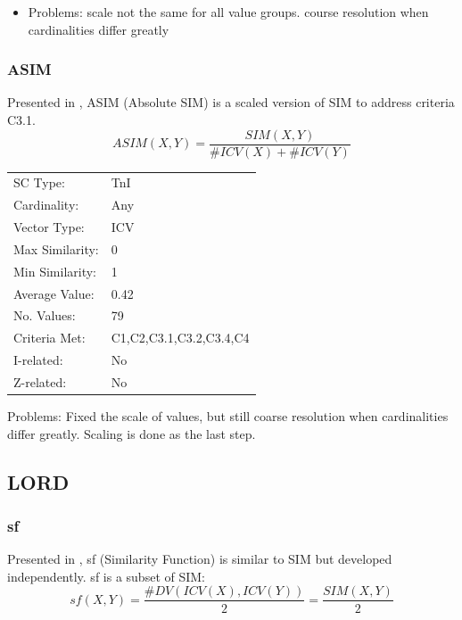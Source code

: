 \documentclass{article}
\begin{document}
\begin{itemize}
\item Problems: scale not the same for all value groups. course resolution
  when cardinalities differ greatly
\end{itemize}
\subsubsection{ASIM}
\label{sec-15-1-3}

Presented in \citet[pp. 450]{Morris1979}, ASIM (Absolute SIM) is a
scaled version of SIM to address criteria C3.1.
$$ASIM\left(X,Y\right)=\frac{SIM\left(X,Y\right)}{\#ICV\left(X\right)+\#ICV\left(Y\right)}$$

\begin{center}
\begin{tabular}{ll}
 SC Type:         &  TnI                      \\
 Cardinality:     &  Any                      \\
 Vector Type:     &  ICV                      \\
 Max Similarity:  &  0                        \\
 Min Similarity:  &  1                        \\
 Average Value:   &  0.42                     \\
 No. Values:      &  79                       \\
 Criteria Met:    &  C1,C2,C3.1,C3.2,C3.4,C4  \\
 I-related:       &  No                       \\
 Z-related:       &  No                       \\
\end{tabular}
\end{center}


Problems: Fixed the scale of values, but still coarse resolution when
cardinalities differ greatly. Scaling is done as the last step.
\subsection{LORD}
\label{sec-15-2}
\subsubsection{sf}
\label{sec-15-2-1}

Presented in \cite[pp. 93]{Lord1981}, sf (Similarity Function) is
similar to SIM but developed independently. sf is a subset of SIM:
$$sf\left(X,Y\right)=\frac{\#DV\left(ICV\left(X\right),ICV\left(Y\right)\right)}{2}=\frac{SIM(X,Y)}{2}$$
\end{document}
